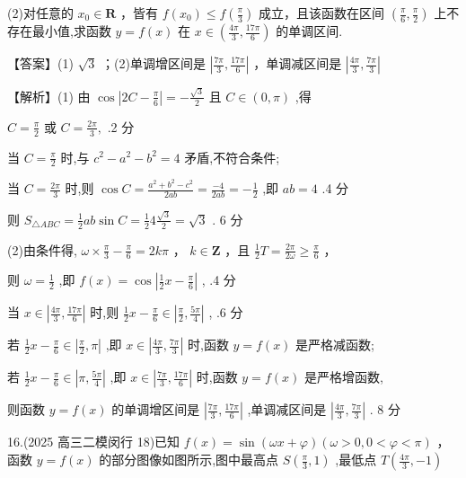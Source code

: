 \documentclass[10pt]{article}
\begin{document}
(2)对任意的 \({x}_{0} \in  \mathbf{R}\) ，皆有 \(f\left( {x}_{0}\right)  \leq  f\left( \frac{\pi }{3}\right)\) 成立，且该函数在区间 \(\left( {\frac{\pi }{6},\frac{\pi }{2}}\right)\) 上不存在最小值,求函数 \(y = f\left( x\right)\) 在 \(x \in  \left( {\frac{4\pi }{3},\frac{17\pi }{6}}\right)\) 的单调区间.

【答案】(1) \(\sqrt{3}\) ；(2)单调增区间是 \(\left| {\frac{7\pi }{3},\frac{17\pi }{6}}\right|\) ，单调减区间是 \(\left| {\frac{4\pi }{3},\frac{7\pi }{3}}\right|\)

【解析】(1) 由 \(\cos \left| {{2C} - \frac{\pi }{6}}\right|  =  - \frac{\sqrt{3}}{2}\) 且 \(C \in  \left( {0,\pi }\right)\) ,得

\(C = \frac{\pi }{2}\) 或 \(C = \frac{2\pi }{3},\) .2 分

当 \(C = \frac{\pi }{2}\) 时,与 \({c}^{2} - {a}^{2} - {b}^{2} = 4\) 矛盾,不符合条件;

当 \(C = \frac{2\pi }{3}\) 时,则 \(\cos C = \frac{{a}^{2} + {b}^{2} - {c}^{2}}{2ab} = \frac{-4}{2ab} =  - \frac{1}{2}\) ,即 \({ab} = 4\) .4 分

则 \({S}_{\bigtriangleup {ABC}} = \frac{1}{2}{ab}\sin C = \frac{1}{2}4\frac{\sqrt{3}}{2} = \sqrt{3}\) . 6 分

(2)由条件得, \(\omega  \times  \frac{\pi }{3} - \frac{\pi }{6} = {2k\pi }\) ， \(k \in  \mathbf{Z}\) ，且 \(\frac{1}{2}T = \frac{2\pi }{2\omega } \geq  \frac{\pi }{6}\) ，

则 \(\omega  = \frac{1}{2}\) ,即 \(f\left( x\right)  = \cos \left| {\frac{1}{2}x - \frac{\pi }{6}}\right|\) , .4 分

当 \(x \in  \left| {\frac{4\pi }{3},\frac{17\pi }{6}}\right|\) 时,则 \(\frac{1}{2}x - \frac{\pi }{6} \in  \left| {\frac{\pi }{2},\frac{5\pi }{4}}\right|\) , .6 分

若 \(\frac{1}{2}x - \frac{\pi }{6} \in  \left| {\frac{\pi }{2},\pi }\right|\) ,即 \(x \in  \left| {\frac{4\pi }{3},\frac{7\pi }{3}}\right|\) 时,函数 \(y = f\left( x\right)\) 是严格减函数;

若 \(\frac{1}{2}x - \frac{\pi }{6} \in  \left| {\pi ,\frac{5\pi }{4}}\right|\) ,即 \(x \in  \left| {\frac{7\pi }{3},\frac{17\pi }{6}}\right|\) 时,函数 \(y = f\left( x\right)\) 是严格增函数,

则函数 \(y = f\left( x\right)\) 的单调增区间是 \(\left| {\frac{7\pi }{3},\frac{17\pi }{6}}\right|\) ,单调减区间是 \(\left| {\frac{4\pi }{3},\frac{7\pi }{3}}\right|\) . 8 分

16.(2025 高三二模闵行 18)已知 \(f\left( x\right)  = \sin \left( {{\omega x} + \varphi }\right) \left( {\omega  > 0,0 < \varphi  < \pi }\right)\) ，函数 \(y = f\left( x\right)\) 的部分图像如图所示,图中最高点 \(S\left( {\frac{\pi }{3},1}\right)\) ,最低点 \(T\left( {\frac{4\pi }{3}, - 1}\right)\)
\end{document}
